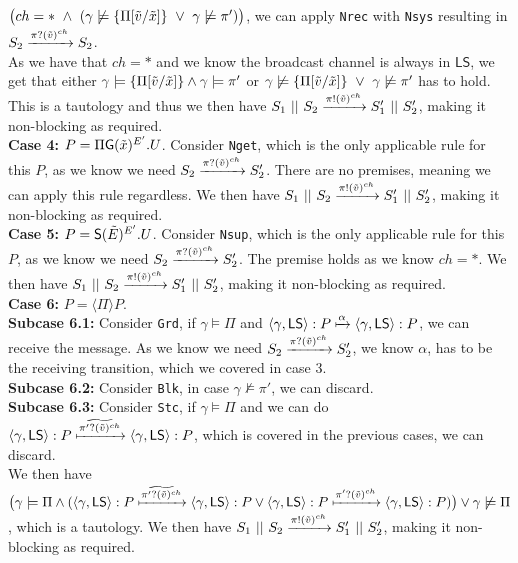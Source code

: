 \indent $\bigl(ch = * \ \land \ (\gamma \not\models \{ \Pi [\Tilde{v}/\Tilde{x}]\} \ \lor \ \gamma \not\models \pi ')\bigr)$, we can apply \texttt{Nrec} with \texttt{Nsys} resulting in $S_2 \xrightarrow[]{\pi ?(\Tilde{v})^{ch}}S_2$.\\
As we have that $ch=*$ and we know the broadcast channel is always in $\mathsf{LS}$, we get that either $\gamma \models \{ \Pi [\Tilde{v}/\Tilde{x}] \} \land \gamma \models \pi ' $ or $\gamma \not\models \{ \Pi [\Tilde{v}/\Tilde{x}]\} \ \lor \ \gamma \not\models \pi '$ has to hold. This is a tautology and thus we then have $S_1\ ||\ S_2 \xrightarrow[]{\pi !(\Tilde{v})^{ch}}S_1'\ ||\ S_2'$, making it non-blocking as required.\\
\textbf{Case 4: } $P=\Pi \mathsf{G} (\Tilde{x})^{E'}.U $. Consider \texttt{Nget}, which is the only applicable rule for this $P$, as we know we need $S_2 \xrightarrow[]{\pi ?(\Tilde{v})^{ch}}S_2'$. There are no premises, meaning we can apply this rule regardless. We then have $S_1\ ||\ S_2 \xrightarrow[]{\pi !(\Tilde{v})^{ch}}S_1'\ ||\ S_2'$, making it non-blocking as required.\\
\textbf{Case 5: } $P=\mathsf{S} (\Tilde{E})^{E'}.U $. Consider \texttt{Nsup}, which is the only applicable rule for this $P$, as we know we need $S_2 \xrightarrow[]{\pi ?(\Tilde{v})^{ch}}S_2'$. The premise holds as we know $ch=*$. We then have $S_1\ ||\ S_2 \xrightarrow[]{\pi !(\Tilde{v})^{ch}}S_1'\ ||\ S_2'$, making it non-blocking as required.\\
\textbf{Case 6: } $P=\langle \Pi \rangle P $.\\
\indent \textbf{Subcase 6.1:} Consider \texttt{Grd}, if $\gamma \models \Pi$ and $\langle \gamma, \mathsf{LS}\rangle : P \xmapsto[]{\alpha}\langle \gamma, \mathsf{LS}\rangle : P$, we can receive the message. As we know we need $S_2 \xrightarrow[]{\pi ?(\Tilde{v})^{ch}}S_2'$, we know $\alpha$, has to be the receiving transition, which we covered in case 3.\\
\indent \textbf{Subcase 6.2:} Consider \texttt{Blk}, in case $\gamma \not\models \pi '$, we can discard. \\
\indent \textbf{Subcase 6.3:} Consider \texttt{Stc}, if $\gamma \models \Pi$ and we can do $\langle \gamma , \mathsf{LS} \rangle : P \xmapsto[]{\widetilde{\pi ' ? (\Tilde{v})^{ch}}}\langle \gamma , \mathsf{LS} \rangle : P $, which is covered in the previous \indent cases, we can discard. \\
We then have $\bigl( \gamma \models \Pi \land (\langle \gamma , \mathsf{LS} \rangle : P \xmapsto[]{\widetilde{\pi ' ? (\Tilde{v})^{ch}}}\langle \gamma , \mathsf{LS} \rangle : P \lor \langle \gamma , \mathsf{LS} \rangle : P \xmapsto[]{\pi ' ? (\Tilde{v})^{ch}}\langle \gamma , \mathsf{LS} \rangle : P )\bigr) \lor \gamma \not\models \Pi$, which is a tautology. We then have $S_1\ ||\ S_2 \xrightarrow[]{\pi !(\Tilde{v})^{ch}}S_1'\ ||\ S_2'$, making it non-blocking as required.\\
